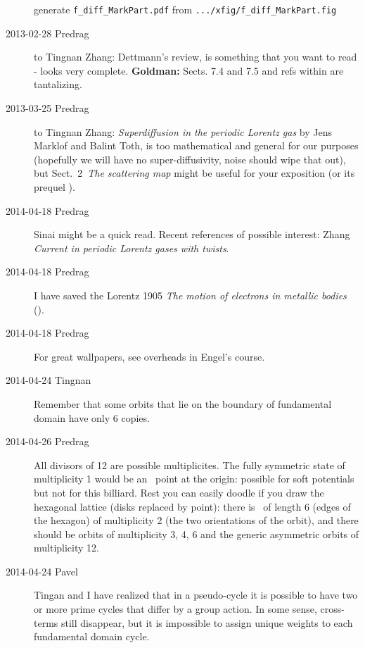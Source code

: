 \begin{description}
generate \texttt{f\_diff\_MarkPart.pdf}
from \texttt{.../xfig/f\_diff\_MarkPart.fig}

\item[2013-02-28 Predrag] to Tingnan Zhang:
Dettmann's review,  is something that you want to read -
looks very complete. {\bf Goldman:} Sects. 7.4 and 7.5 and refs within
are tantalizing.

\item[2013-03-25 Predrag] to Tingnan Zhang:
{\em Superdiffusion in the periodic Lorentz gas} by
Jens Marklof and Balint Toth,  	 is too mathematical and
general for our purposes (hopefully we will have no super-diffusivity, noise
should wipe that out), but
Sect.~2~{\em The scattering map} might be useful for your exposition
(or its prequel  ).

\item[2014-04-18 Predrag]
Sinai might be a quick read.
Recent references of possible interest:
Zhang
{\em Current in periodic {Lorentz} gases with twists}.

\item[2014-04-18 Predrag]
I have saved the Lorentz 1905
{\em The motion of electrons in metallic bodies}
().

\item[2014-04-18 Predrag]
For great wallpapers, see overheads in
{Engel's} course.

\item[2014-04-24 Tingnan]
Remember that some orbits that lie on the boundary of fundamental domain
have only 6 copies.

\item[2014-04-26 Predrag]
All divisors of 12 are possible multiplicites. The fully symmetric state
of multiplicity 1 would be an \eqv\ point at the origin: possible for
soft potentials but not for this billiard. Rest you can easily doodle if
you draw the hexagonal lattice (disks replaced by point): there is \po\
of length 6 (edges of the hexagon) of multiplicity 2 (the two
orientations of the orbit), and there should be orbits of multiplicity 3,
4, 6 and the generic asymmetric orbits of multiplicity 12.

\item[2014-04-24 Pavel]
Tingan and I have realized that in a
pseudo-cycle it is possible to have two or more prime cycles that differ
by a group action. In some sense, cross-terms still disappear, but it is
impossible to assign unique weights to each fundamental domain cycle.


\end{description}
